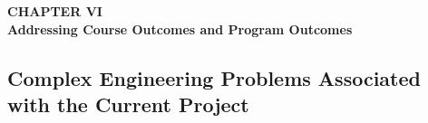 \section*{}
\begin{center}
    {\fontsize{14}{1.5}\selectfont \textbf{CHAPTER VI}}\\
    \vspace{12pt}
    {\fontsize{16}{1.5}\selectfont \textbf{Addressing Course Outcomes and Program Outcomes}}\\
    \vspace{12pt}
    \vspace{12pt}
\end{center}

\setcounter{section}{6}
\setcounter{subsection}{0}
\setcounter{table}{0}
\setcounter{figure}{0}


\subsection{Complex Engineering Problems Associated with the Current Project}

